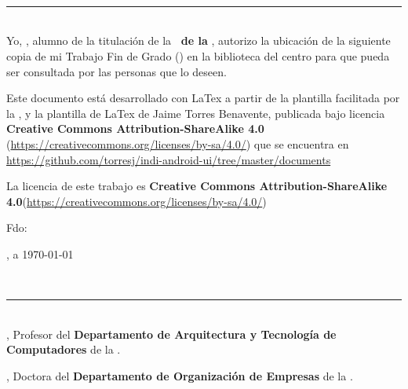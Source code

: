 \begin{center}
{\LARGE\bfseries\titulo}\\
\end{center}
\begin{center}
\autor\
\end{center}

\newpage
\thispagestyle{empty}
\
\vspace{3cm}

\noindent\rule[-1ex]{\textwidth}{2pt}\\[4.5ex]

Yo, \textbf{\autor}, alumno de la titulación \textbf{\grado} de la \textbf{\escuela\ de la \universidad}, autorizo la ubicación de la siguiente copia de mi Trabajo Fin de Grado (\textit{\titulo}) en la biblioteca del centro para que pueda ser consultada por las personas que lo deseen.

\bigskip
Este documento está desarrollado con LaTex a partir de la plantilla facilitada por la \escuela, y la plantilla de LaTex de Jaime Torres Benavente, publicada bajo licencia \textbf{Creative Commons Attribution-ShareAlike 4.0} (\url{https://creativecommons.org/licenses/by-sa/4.0/}) que se encuentra en \url{https://github.com/torresj/indi-android-ui/tree/master/documents}

\bigskip
La licencia de este trabajo es \textbf{Creative Commons Attribution-ShareAlike 4.0}(\url{https://creativecommons.org/licenses/by-sa/4.0/}) 


\noindent Fdo: \autor


\vspace{2cm}

\begin{flushright}
\ciudad, a \today
\end{flushright}

\newpage
\thispagestyle{empty}
\
\vspace{3cm}

\noindent\rule[-1ex]{\textwidth}{2pt}\\[4.5ex]

\textbf{\tutor}, Profesor del \textbf{Departamento de Arquitectura y Tecnología de Computadores} de la \textbf{\universidad}.

\textbf{\cotutor}, Doctora del \textbf{Departamento de Organización de Empresas} de la \textbf{\universidad}.

\vspace{0.5cm}

\vspace{0.5cm}

